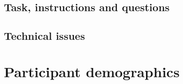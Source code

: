 \subsection{Task, instructions and questions}
\label{task_instructions_questions}
%



\subsection{Technical issues}
\label{technical_issues}
%
%




\section{Participant demographics}
\label{participant_demographics}
